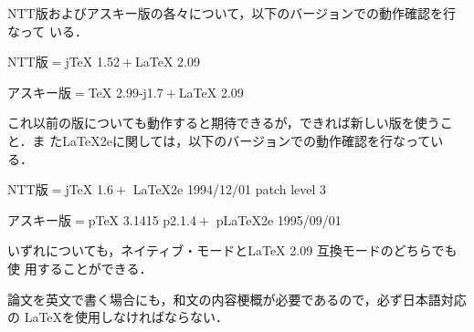 \documentclass[master]{kuisthesis}		%
\def\LATEXe{\ifx\LaTeXe\undefined \LaTeX 2e\else\LaTeXe\fi}
\begin{document}
NTT版およびアスキー版の各々について，以下のバージョンでの動作確認を行なって
いる．
\begin{ITEMIZE}%
\item
NTT版${}={}${j\TeX} 1.52${}+{}${\LaTeX} 2.09
\item 
アスキー版${}={}${\TeX} 2.99-j1.7${}+{}${\LaTeX} 2.09
\end{ITEMIZE}%
これ以前の版についても動作すると期待できるが，できれば新しい版を使うこと．ま
た{\LATEXe}に関しては，以下のバージョンでの動作確認を行なっている．
\begin{ITEMIZE}%
\item
NTT版${}={}${j\TeX} 1.6${}+{}$%
	{\LATEXe} 1994/12/01 patch level 3
\item 
アスキー版${}={}${p\TeX} 3.1415 p2.1.4${}+{}$%
	{p\LATEXe} 1995/09/01
\end{ITEMIZE}%
いずれについても，ネイティブ・モードと{\LaTeX} 2.09 互換モードのどちらでも使
用することができる．

論文を英文で書く場合にも，和文の内容梗概が必要であるので，必ず日本語対応の
\LaTeX を使用しなければならない．

\end{document}
